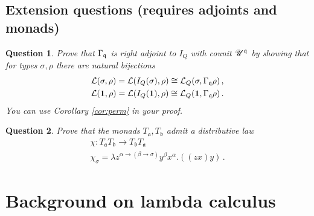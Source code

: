 \documentclass[english,letter paper,12pt,leqno]{article}
\def\typearrow{\Rightarrow}
\newcommand{\scr}[1]{\mathscr{#1}}
\newtheorem{question}{Question}
\theoremstyle{example}
\numberwithin{equation}{section}
\newcommand{\call}[1]{\mathcal{#1}}
\def\typearrow{\rightarrow}
\begin{document}
\subsection{Extension questions (requires adjoints and monads)}

\begin{question}
	Prove that $\Gamma_{\frak{q}}$ is right adjoint to $I_Q$ with counit $\scr{U}^{\frak{q}}$ by showing that for types $\sigma, \rho$ there are natural bijections
	\begin{gather}
		\call{L}( \sigma, \rho ) = \call{L}( I_Q( \sigma ), \rho ) \cong \call{L}_Q( \sigma, \Gamma_\mathfrak{q} \rho )\,,\label{eq:adjun_1}\\
		\call{L}( \bold{1}, \rho ) = \call{L}( I_Q( \bold{1} ), \rho ) \cong \call{L}_Q( \bold{1}, \Gamma_\mathfrak{q} \rho )\,.\label{eq:adjun_2}
	\end{gather}
	You can use Corollary \ref{cor:perm} in your proof.
\end{question}

\begin{question}
	Prove that the monads $T_{\mathfrak{a}}, T_\mathfrak{b}$ admit a distributive law
	\begin{gather*}
		\chi: T_\mathfrak{a} T_\mathfrak{b} \longrightarrow T_\mathfrak{b}T_\mathfrak{a}\,\\
		\chi_{\sigma} = \lambda z^{\alpha \typearrow (\beta \typearrow \sigma)} y^\beta x^\alpha.((zx)y)\,.
	\end{gather*}
\end{question}

\appendix

\section{Background on lambda calculus}\label{section:intro_lambda}
\end{document}

